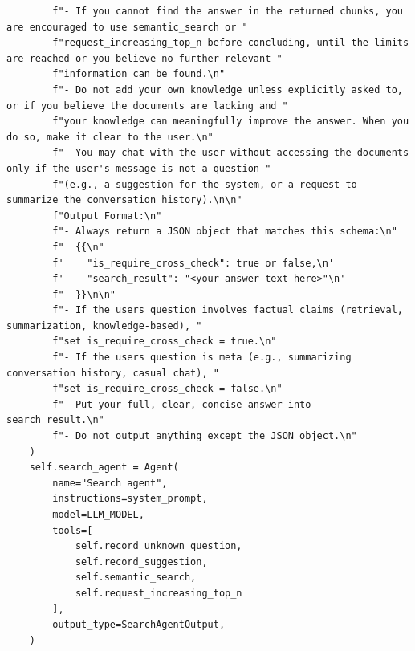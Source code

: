 \begin{lstlisting}
        f"- If you cannot find the answer in the returned chunks, you are encouraged to use semantic_search or "
        f"request_increasing_top_n before concluding, until the limits are reached or you believe no further relevant "
        f"information can be found.\n"
        f"- Do not add your own knowledge unless explicitly asked to, or if you believe the documents are lacking and "
        f"your knowledge can meaningfully improve the answer. When you do so, make it clear to the user.\n"
        f"- You may chat with the user without accessing the documents only if the user's message is not a question "
        f"(e.g., a suggestion for the system, or a request to summarize the conversation history).\n\n"
        f"Output Format:\n"
        f"- Always return a JSON object that matches this schema:\n"
        f"  {{\n"
        f'    "is_require_cross_check": true or false,\n'
        f'    "search_result": "<your answer text here>"\n'
        f"  }}\n\n"
        f"- If the users question involves factual claims (retrieval, summarization, knowledge-based), "
        f"set is_require_cross_check = true.\n"
        f"- If the users question is meta (e.g., summarizing conversation history, casual chat), "
        f"set is_require_cross_check = false.\n"
        f"- Put your full, clear, concise answer into search_result.\n"
        f"- Do not output anything except the JSON object.\n"
    )
    self.search_agent = Agent(
        name="Search agent",
        instructions=system_prompt,
        model=LLM_MODEL,
        tools=[
            self.record_unknown_question,
            self.record_suggestion,
            self.semantic_search,
            self.request_increasing_top_n
        ],
        output_type=SearchAgentOutput,
    )


\end{lstlisting}
